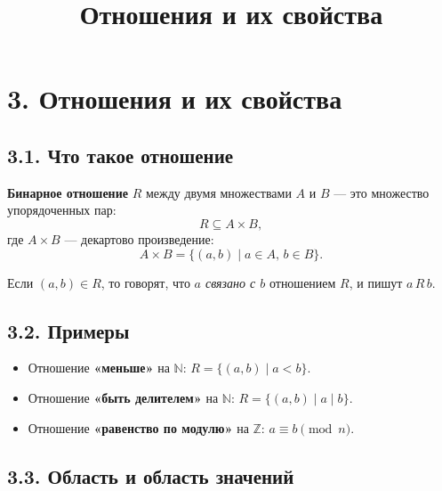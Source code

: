 \documentclass{article}
\begin{document}
\title{Отношения и их свойства}
\author{}
\date{}
\makeatletter
\renewcommand{\maketitle}{
  \begin{center}
    {\Large\mdseries\@title\par}
    \vspace{0.5em}
  \end{center}
}
\makeatother
\maketitle

\section*{3. Отношения и их свойства}

\subsection*{3.1. Что такое отношение}

\textbf{Бинарное отношение} $R$ между двумя множествами $A$ и $B$ — это множество упорядоченных пар:
\[
R \subseteq A \times B,
\]
где $A \times B$ — декартово произведение:
\[
A \times B = \{ (a, b) \mid a \in A,\, b \in B \}.
\]

Если $(a, b) \in R$, то говорят, что \textit{$a$ связано с $b$} отношением $R$, и пишут $a\,R\,b$.

\subsection*{3.2. Примеры}

\begin{itemize}[leftmargin=*]
  \item Отношение \textbf{«меньше»} на $\mathbb{N}$: $R = \{(a, b) \mid a < b\}$.
  \item Отношение \textbf{«быть делителем»} на $\mathbb{N}$: $R = \{(a, b) \mid a \mid b\}$.
  \item Отношение \textbf{«равенство по модулю»} на $\mathbb{Z}$: $a \equiv b \pmod{n}$.
\end{itemize}

\subsection*{3.3. Область и область значений}
\end{document}
